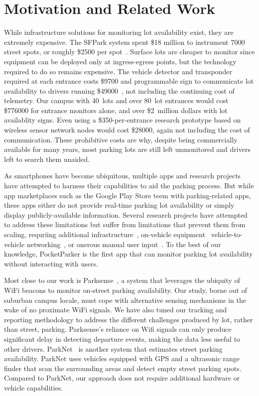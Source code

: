 \section{Motivation and Related Work}
\label{sec-related}

While infrastructure solutions for monitoring lot availability exist, they
are extremely expensive. The SFPark system spent \$18 million to instrument
\num{7000} street spots, or roughly \$\num{2500} per spot~\cite{sfpark}.
Surface lots are cheaper to monitor since equipment can be deployed only at
ingress-egress points, but the technology required to do so remains
expensive. The vehicle detector and transponder required at each entrance
costs \$\num{9700} and programmable sign to communicate lot availability to
drivers running \$\num{49000}~\cite{mstp-park}, not including the continuing
cost of telemetry. Our campus with 40~lots and over 80~lot entrances would
cost \$\num{776000} for entrance monitors alone, and over \$2~million dollars
with lot availablity signs. Even using a \$\num{350}-per-entrance research
prototype based on wireless sensor network nodes would cost \$\num{28000},
again not including the cost of communication. These prohibitive costs are
why, despite being commercially available for many years, most parking lots
are still left unmonitored and drivers left to search them unaided.

As smartphones have become ubiquitous, multiple apps and research projects
have attempted to harness their capabilities to aid the parking process. But
while app marketplaces such as the Google Play Store teem with
parking-related apps, these apps either do not provide real-time parking lot
availability or simply display publicly-available information. Several
research projects have attempted to address these limitations but suffer from
limitations that prevent them from scaling, requriing additional
infrastructure~\cite{5062057}, on-vehicle equipment~\cite{Mathur:2010:PDS}
vehicle-to-vehicle networking~\cite{Delot:2009:CRP, Mathur:2010:PDS}, or
onerous manual user input~\cite{Chen:2012:COS}. To the best of our knowledge,
PocketParker is the first app that can monitor parking lot availability
without interacting with users.

Most close to our work is Parksense~\cite{Nawaz:2013:PSB}, a system that
leverages the ubiquity of WiFi beacons to monitor on-street parking
availability. Our study, borne out of suburban campus locale, must cope with
alternative sensing mechanisms in the wake of no proximate WiFi signals. We
have also tuned our tracking and reporting methodology to address the
different challenges produced by lot, rather than street, parking.
Parksense's reliance on Wifi signals can only produce significant delay in
detecting departure events, making the data less useful to other drivers.
ParkNet~\cite{Mathur:2010:PDS} is another system that estimates street
parking availability. ParkNet uses vehicles equipped with GPS and a
ultrasonic range finder that scan the surrounding areas and detect empty
street parking spots. Compared to ParkNet, our approach does not require
additional hardware or vehicle capabilities.


